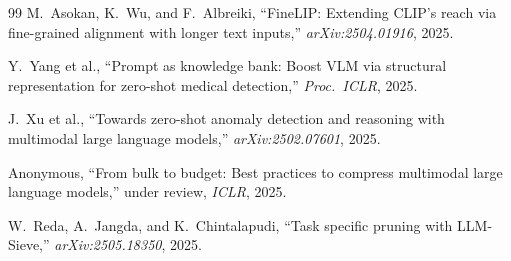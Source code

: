 \documentclass[11pt]{article}
\begin{document}
\begin{thebibliography}{99}
M.~Asokan, K.~Wu, and F.~Albreiki, ``FineLIP: Extending CLIP's reach via fine-grained alignment with longer text inputs,'' \textit{arXiv:2504.01916}, 2025.

Y.~Yang et al., ``Prompt as knowledge bank: Boost VLM via structural representation for zero-shot medical detection,'' \textit{Proc.\ ICLR}, 2025.

J.~Xu et al., ``Towards zero-shot anomaly detection and reasoning with multimodal large language models,'' \textit{arXiv:2502.07601}, 2025.

Anonymous, ``From bulk to budget: Best practices to compress multimodal large language models,'' under review, \textit{ICLR}, 2025.

W.~Reda, A.~Jangda, and K.~Chintalapudi, ``Task specific pruning with LLM-Sieve,'' \textit{arXiv:2505.18350}, 2025.


\end{thebibliography}
\end{document}
